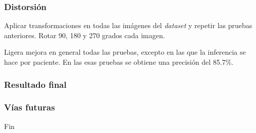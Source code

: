 \documentclass{beamer}
\begin{document}
\begin{frame}
\frametitle{Distorsión}

Aplicar transformaciones en todas las imágenes del \textit{dataset} y repetir las pruebas anteriores. Rotar 90, 180 y 270 grados cada imagen.

\begin{table}[H]
\centering
{}
\caption{Resultados pruebas con distorsión.}
\end{table}

Ligera mejora en general todas las pruebas, excepto en las que la inferencia se hace por paciente. En las esas pruebas se obtiene una precisión del 85.7\%.

\end{frame}



\begin{frame}
\frametitle{Resultado final}

\end{frame}



\begin{frame}
\frametitle{Vías futuras}

\end{frame}



\begin{frame}
\Huge{\centerline{Fin}}
\end{frame}
\end{document}
